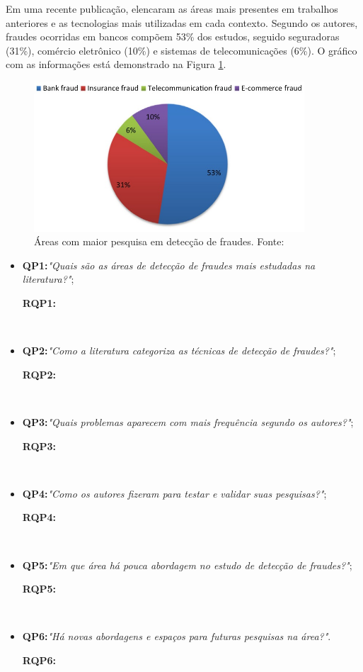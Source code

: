 \documentclass[smallextended]{svjour3}
\begin{document}
Em uma recente publicação, \cite{Abdallah2016} elencaram as áreas mais presentes em trabalhos anteriores e as tecnologias mais utilizadas em cada contexto. Segundo os autores, fraudes ocorridas em bancos compõem 53\% dos estudos, seguido seguradoras (31\%), comércio eletrônico (10\%) e sistemas de telecomunicações (6\%). O gráfico com as informações está demonstrado na Figura \ref{fig:fraudespopulares}. 

\begin{figure}[!ht]
	\centering
	\includegraphics[width=0.9\textwidth]{imagens/fraudespopulares.jpg}
	\caption{Áreas com maior pesquisa em detecção de fraudes. Fonte: \cite{Abdallah2016}}
	\label{fig:fraudespopulares}
\end{figure}


\begin{itemize}
	\item \textbf{QP1:}\textit{"Quais são as áreas de detecção de fraudes mais estudadas na literatura?"};
	
	\textbf{RQP1:}
	
	\
	\item \textbf{QP2:}\textit{"Como a literatura categoriza as técnicas de detecção de fraudes?"};
	
	\textbf{RQP2:}
	
	\
	\item \textbf{QP3:}\textit{"Quais problemas aparecem com mais frequência segundo os autores?"};
	
	\textbf{RQP3:}
	
	\
	\item \textbf{QP4:}\textit{"Como os autores fizeram para testar e validar suas pesquisas?"};
	
	\textbf{RQP4:}
	
	\
	\item \textbf{QP5:}\textit{"Em que área há pouca abordagem no estudo de detecção de fraudes?"};
	
	\textbf{RQP5:}
	
	\
	\item \textbf{QP6:}\textit{"Há novas abordagens e espaços para futuras pesquisas na área?"}.
	
	\textbf{RQP6:}
	
\end{itemize}
\end{document}
